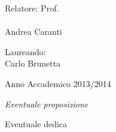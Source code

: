 \documentclass[a4paper,10pt, openany, oneside]{book}%
\theoremstyle{plain}%
\theoremstyle{definition}
\theoremstyle{remark}
\begin{document}
\begin{titlepage}
\begin{center}
\begin{minipage}[t]{0.47\textwidth}
{\large{\sc Relatore: Prof.}\\
{ \\ Andrea Caranti}}\\
\end{minipage}
\hfill
\begin{minipage}[t]{0.47\textwidth}\raggedleft
{\large{\sc Laureando:}\\ 
\vspace{5mm} 
{ Carlo Brunetta}}
\end{minipage}
\vspace{20mm}
\begin{center}
{\large{\sc Anno Accademico 2013/2014}}
\end{center}
\end{center}
\end{titlepage}

\thispagestyle{empty}

\newpage
\thispagestyle{empty}
\begin{flushleft}
\textit{Eventuale proposizione}\\
\end{flushleft}
\vspace*{3cm}
\begin{flushright}
Eventuale dedica
\end{flushright}

\newpage
\tableofcontents
\newpage


\mainmatter













\end{document}
